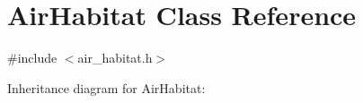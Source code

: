 \hypertarget{classAirHabitat}{}\section{Air\+Habitat Class Reference}
\label{classAirHabitat}


{\ttfamily \#include $<$air\+\_\+habitat.\+h$>$}



Inheritance diagram for Air\+Habitat\+:
